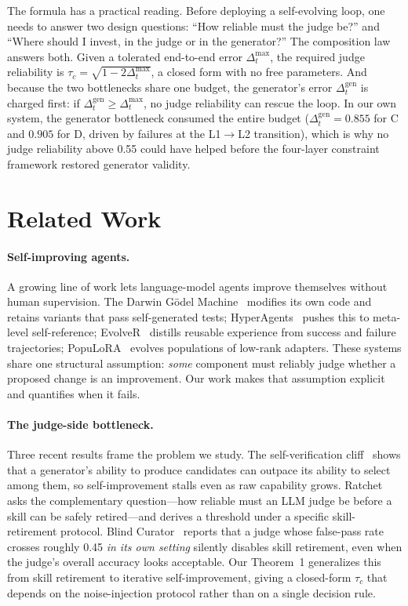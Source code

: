 \documentclass{article}
\begin{document}
The formula has a practical reading. Before deploying a self-evolving loop, one needs to answer two
design questions: ``How reliable must the judge be?'' and ``Where should I invest, in the judge or in
the generator?'' The composition law answers both. Given a tolerated end-to-end error
$\Delta_t^{\max}$, the required judge reliability is $\tau_c = \sqrt{1 - 2\Delta_t^{\max}}$, a closed
form with no free parameters. And because the two bottlenecks share one budget, the generator's error
$\Delta_t^{\mathrm{gen}}$ is charged first: if $\Delta_t^{\mathrm{gen}} \ge \Delta_t^{\max}$, no judge
reliability can rescue the loop. In our own system, the generator bottleneck consumed the entire
budget ($\Delta_t^{\mathrm{gen}} = 0.855$ for C and $0.905$ for D, driven by failures at the
L1$\to$L2 transition), which is why no judge reliability above 0.55 could have helped before the
four-layer constraint framework restored generator validity.

\section{Related Work}

\paragraph{Self-improving agents.}
A growing line of work lets language-model agents improve themselves without human supervision. The Darwin Gödel Machine~\cite{dgm} modifies its own code and retains variants that pass self-generated tests; HyperAgents~\cite{hyperagents} pushes this to meta-level self-reference; EvolveR~\cite{evolver} distills reusable experience from success and failure trajectories; PopuLoRA~\cite{populora} evolves populations of low-rank adapters. These systems share one structural assumption: \emph{some} component must reliably judge whether a proposed change is an improvement. Our work makes that assumption explicit and quantifies when it fails.

\paragraph{The judge-side bottleneck.}
Three recent results frame the problem we study. The self-verification cliff~\cite{self_verification_cliff} shows that a generator's ability to produce candidates can outpace its ability to select among them, so self-improvement stalls even as raw capability grows. Ratchet~\cite{ratchet} asks the complementary question---how reliable must an LLM judge be before a skill can be safely retired---and derives a threshold under a specific skill-retirement protocol. Blind Curator~\cite{blind_curator} reports that a judge whose false-pass rate crosses roughly 0.45 \textit{in its own setting} silently disables skill retirement, even when the judge's overall accuracy looks acceptable. Our Theorem~1 generalizes this from skill retirement to iterative self-improvement, giving a closed-form $\tau_c$ that depends on the noise-injection protocol rather than on a single decision rule.
\end{document}
